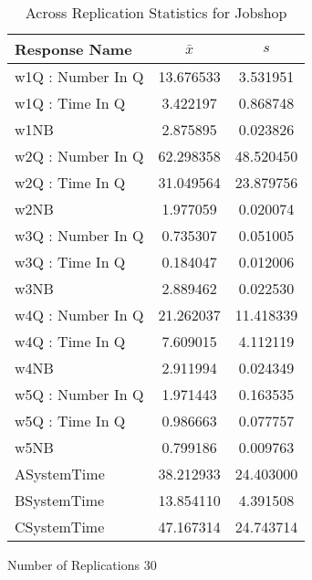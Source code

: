 \documentclass[11pt]{article}
\begin{document}
 
\begin{table}[ht] 
\caption{Across Replication Statistics for Jobshop} 
\centering 
\begin{tabular}{lcc} 
\hline 
Response Name & $ \bar{x} $ & $ s $ \\ 
\hline 
w1Q : Number In Q &    13.676533 &     3.531951 \\ 
w1Q : Time In Q &     3.422197 &     0.868748 \\ 
w1NB &     2.875895 &     0.023826 \\ 
w2Q : Number In Q &    62.298358 &    48.520450 \\ 
w2Q : Time In Q &    31.049564 &    23.879756 \\ 
w2NB &     1.977059 &     0.020074 \\ 
w3Q : Number In Q &     0.735307 &     0.051005 \\ 
w3Q : Time In Q &     0.184047 &     0.012006 \\ 
w3NB &     2.889462 &     0.022530 \\ 
w4Q : Number In Q &    21.262037 &    11.418339 \\ 
w4Q : Time In Q &     7.609015 &     4.112119 \\ 
w4NB &     2.911994 &     0.024349 \\ 
w5Q : Number In Q &     1.971443 &     0.163535 \\ 
w5Q : Time In Q &     0.986663 &     0.077757 \\ 
w5NB &     0.799186 &     0.009763 \\ 
ASystemTime &    38.212933 &    24.403000 \\ 
BSystemTime &    13.854110 &     4.391508 \\ 
CSystemTime &    47.167314 &    24.743714 \\ 
\hline 
\end{tabular} 

 Number of Replications 30 
\end{table} 
\end{document}
